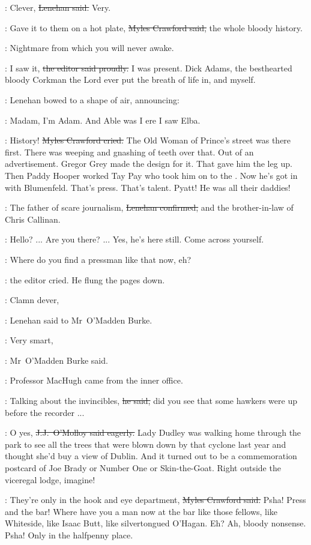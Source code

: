 \lenehan:
Clever,
\sout{Lenehan said.}
Very.

\crawford:
Gave it to them on a hot plate,
\sout{Myles Crawford said,}
the whole bloody history.

\StephenInt:
Nightmare from which you will never awake.

\crawford:
I saw it,
\sout{the editor said proudly.}
I was present.
Dick Adams, the besthearted bloody Corkman the Lord ever put the breath of life in,
and myself.

:
Lenehan bowed to a shape of air,
announcing:

\lenehan:
Madam,
I'm Adam.
And Able was I ere I saw Elba.

\crawford:
History!
\sout{Myles Crawford cried.}
The Old Woman of Prince's street was there first.
There was weeping and gnashing of teeth over that.
Out of an advertisement.
Gregor Grey made the design for it.
That gave him the leg up.
Then Paddy Hooper worked Tay Pay who took him on to the .
Now he's got in with Blumenfeld.
That's press.
That's talent.
Pyatt!
He was all their daddies!

\lenehan:
The father of scare journalism,
\sout{Lenehan confirmed,}
and the brother-in-law of Chris Callinan.

\machugh:
Hello? ...
Are you there? ...
Yes, he's here still.
Come across yourself.

\crawford:
Where do you find a pressman like that now, eh?

:
the editor cried.
He flung the pages down.

\lenehan:
Clamn dever,

:
Lenehan said to Mr~O'Madden Burke.

\omaddenburke:
Very smart,

:
Mr~O'Madden Burke said.

:
Professor MacHugh came from the inner office.

\machugh:
Talking about the invincibles,
\sout{he said,}
did you see that some hawkers were up before the recorder ...

\jjom:
O yes,
\sout{J.J.~O'Molloy said eagerly.}
Lady Dudley was walking home through the park
to see all the trees that were blown down by that cyclone last year
and thought she'd buy a view of Dublin.
And it turned out to be a commemoration postcard
of Joe Brady or Number One or Skin-the-Goat.
Right outside the viceregal lodge,
imagine!

\crawford:
They're only in the hook and eye department,
\sout{Myles Crawford said.}
Psha!
Press and the bar!
Where have you a man now at the bar like those fellows,
like Whiteside,
like Isaac Butt,
like silvertongued O'Hagan.
Eh?
Ah, bloody nonsense.
Psha!
Only in the halfpenny place.

